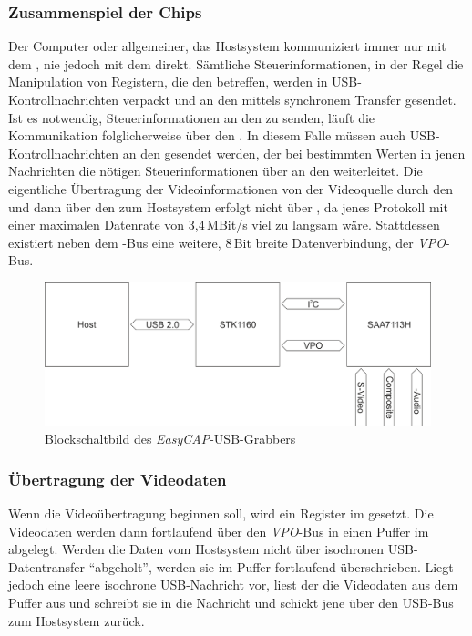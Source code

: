\subsubsection{Zusammenspiel der Chips}
Der Computer oder allgemeiner, das Hostsystem kommuniziert immer nur mit dem \stk, nie jedoch mit dem \saa{} direkt.
Sämtliche Steuerinformationen, in der Regel die Manipulation von Registern, die den \stk{} betreffen, werden in USB-Kontrollnachrichten verpackt und an den \stk{} mittels synchronem Transfer gesendet.
Ist es notwendig, Steuerinformationen an den \saa{} zu senden, läuft die Kommunikation folglicherweise über den \stk.
In diesem Falle müssen auch USB-Kontrollnachrichten an den \stk{} gesendet werden, der bei bestimmten Werten in jenen Nachrichten die nötigen Steuerinformationen über \iic{} an den \saa{} weiterleitet.
Die eigentliche Übertragung der Videoinformationen von der Videoquelle durch den \saa{} und dann über den \stk{} zum Hostsystem erfolgt nicht über \iic, da jenes Protokoll mit einer maximalen Datenrate von 3,4\,MBit/s viel zu langsam wäre.
Stattdessen existiert neben dem \iic-Bus eine weitere, 8\,Bit breite Datenverbindung, der \emph{VPO}-Bus.
\begin{figure}[h]
 \centering
 \includegraphics[width=\textwidth]{blockschaltbild}
 \caption{Blockschaltbild des \emph{EasyCAP}-USB-Grabbers}
\end{figure}

\subsubsection{Übertragung der Videodaten}
Wenn die Videoübertragung beginnen soll, wird ein Register im \saa{} gesetzt.
Die Videodaten werden dann fortlaufend über den \emph{VPO}-Bus in einen Puffer im \stk{} abgelegt.
Werden die Daten vom Hostsystem nicht über isochronen USB-Datentransfer "`abgeholt"', werden sie im Puffer fortlaufend überschrieben.
Liegt jedoch eine leere isochrone USB-Nachricht vor, liest der \stk{} die Videodaten aus dem Puffer aus und schreibt sie in die Nachricht und schickt jene über den USB-Bus zum Hostsystem zurück.